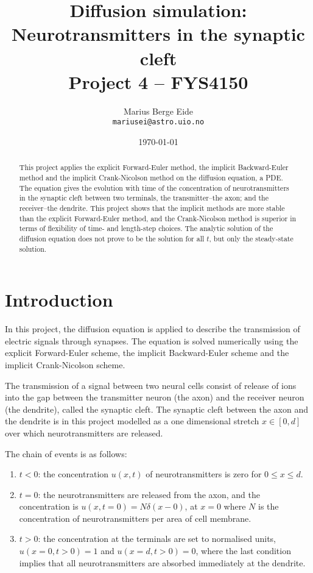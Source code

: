 \documentclass[a4paper,11pt]{article}
\date{\today}
\title{Diffusion simulation:\\ Neurotransmitters in the synaptic cleft\\ \small{Project 4 -- FYS4150}}
\author{Marius Berge Eide \\
\texttt{mariusei@astro.uio.no}}
\begin{document}
\onecolumn
\maketitle{}

\begin{abstract}
This project applies the explicit Forward-Euler method, the implicit Backward-Euler method and the implicit Crank-Nicolson method on the diffusion equation, a PDE. The equation gives the evolution with time of the concentration of neurotransmitters in the synaptic cleft between two terminals, the transmitter--the axon; and the receiver--the dendrite. This project shows that the implicit methods are more stable than the explicit Forward-Euler method, and the Crank-Nicolson method is superior in terms of flexibility of time- and length-step choices. The analytic solution of the diffusion equation does not prove to be the solution for all $t$, but only the steady-state solution.
\end{abstract}

\section{Introduction}
In this project, the diffusion equation is applied to describe the transmission of electric signals through synapses. The equation is solved numerically using the explicit Forward-Euler scheme, the implicit Backward-Euler scheme and the implicit Crank-Nicolson scheme.

The transmission of a signal between two neural cells consist of release of ions into the gap between the transmitter neuron (the axon) and the receiver neuron (the dendrite), called the synaptic cleft. The synaptic cleft between the axon and the dendrite is in this project modelled as a one dimensional stretch $x \in [0,d]$ over which neurotransmitters are released.

The chain of events is as follows:
\begin{enumerate}
    \item $t<0$: the concentration $u(x,t)$ of neurotransmitters is zero for $0 \leq x \leq d$.
    \item $t=0$: the neurotransmitters are released from the axon, and the concentration is $u(x,t=0) = N \delta(x-0)$, at $x=0$ where $N$ is the concentration of neurotransmitters per area of cell membrane.
    \item $t>0$: the concentration at the terminals are set to normalised units, $u(x=0, t>0) = 1$ and $u(x=d, t>0) = 0$, where the last condition implies that all neurotransmitters are absorbed immediately at the dendrite.
\end{enumerate}
\end{document}
